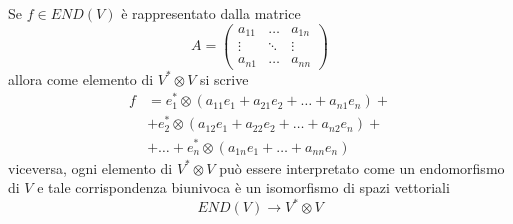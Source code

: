 \documentclass[../main.tex]{subfiles}
\begin{document}
Se $f \in END(V)$ è rappresentato dalla matrice
\begin{equation*}
    A = \begin{pmatrix}
        a_{11} & \ldots & a_{1n} \\
        \vdots & \ddots & \vdots \\
        a_{n1} & \ldots & a_{nn}
    \end{pmatrix}
\end{equation*}
allora come elemento di $V^* \otimes V$ si scrive
\begin{align*}
    f & = e_1^* \otimes (a_{11}e_1 + a_{21}e_2 + \ldots + a_{n1}e_n) + \\
      & + e_2^* \otimes (a_{12}e_1 + a_{22}e_2 + \ldots + a_{n2}e_n) + \\
      & + \ldots + e_n^* \otimes (a_{1n}e_1 + \ldots + a_{nn}e_n)
\end{align*}
viceversa, ogni elemento di $V^* \otimes V$ può essere interpretato come un endomorfismo di $V$ e tale corrispondenza biunivoca è un isomorfismo di spazi vettoriali
\begin{equation*}
    END(V) \rightarrow V^* \otimes V
\end{equation*}
\end{document}
